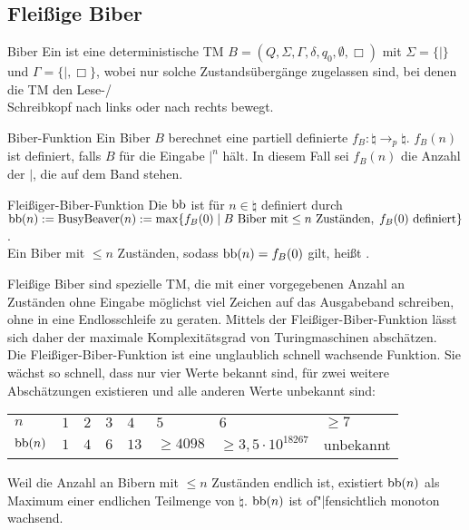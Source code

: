 \pagebreak

\subsection{%
    Fleißige Biber%
}

\begin{Def}{Biber}
    Ein  ist eine deterministische TM
    $B = (Q, \Sigma, \Gamma, \delta, q_0, \emptyset, \Box)$ mit
    $\Sigma = \{|\}$ und $\Gamma = \{|, \Box\}$, wobei nur solche Zustandsübergänge zugelassen
    sind, bei denen die TM den Lese-/\\Schreibkopf nach links oder nach rechts bewegt.
\end{Def}

\begin{Def}{Biber-Funktion}
    Ein Biber $B$ berechnet eine partiell definierte 
    $f_B\colon \natural \rightarrow_p \natural$.
    $f_B(n)$ ist definiert, falls $B$ für die Eingabe $|^n$ hält.
    In diesem Fall sei $f_B(n)$ die Anzahl der $|$, die auf dem Band stehen.
\end{Def}

\begin{Def}{Fleißiger-Biber-Funktion}
    Die  $\text{bb}$ ist für $n \in \natural$ definiert durch
    $\text{bb}(n) := \text{BusyBeaver}(n) :=
    \max\{f_B(0) \;|\; B \text{ Biber mit} \le n \text{ Zuständen},\;
    f_B(0) \text{ definiert}\}$.\\
    Ein Biber mit $\le n$ Zuständen, sodass $\text{bb}(n) = f_B(0)$ gilt, heißt
    .
\end{Def}

\begin{Bem}
    Fleißige Biber sind spezielle TM, die mit einer vorgegebenen Anzahl an Zuständen ohne
    Eingabe möglichst viel Zeichen auf das Ausgabeband schreiben, ohne in eine Endlosschleife
    zu geraten.
    Mittels der Fleißiger-Biber-Funktion lässt sich daher der maximale Komplexitätsgrad von
    Turingmaschinen abschätzen.\\
    Die Fleißiger-Biber-Funktion ist eine unglaublich schnell wachsende Funktion.
    Sie wächst so schnell, dass nur vier Werte bekannt sind, für zwei weitere Abschätzungen
    existieren und alle anderen Werte unbekannt sind:

    \begin{tabular}{p{15mm}p{5mm}p{5mm}p{5mm}p{5mm}p{15mm}p{25mm}p{20mm}}
        \toprule
        \textbf{$n$} &
        $1$ & $2$ & $3$ & $4$ & $5$ & $6$ & $\ge 7$\\

        \textbf{$\text{bb}(n)$} &
        $1$ & $4$ & $6$ & $13$ & $\ge 4098$ & $\ge 3{,}5 \cdot 10^{18267}$ & unbekannt\\
        \bottomrule
    \end{tabular}

    Weil die Anzahl an Bibern mit $\le n$ Zuständen endlich ist, existiert $\text{bb}(n)$ als
    Maximum einer endlichen Teilmenge von $\natural$.
    $\text{bb}(n)$ ist of"|fensichtlich monoton wachsend.
\end{Bem}

